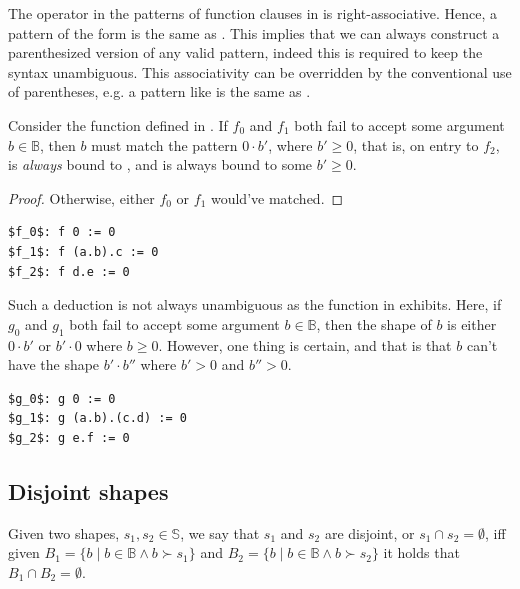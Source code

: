 The  operator in the patterns of function clauses in \D{} is
right-associative. Hence, a pattern of the form  is the same as
. This implies that we can always construct a parenthesized
version of any valid pattern, indeed this is required to keep the syntax
unambiguous. This associativity can be overridden by the conventional use of
parentheses, e.g. a pattern like  is the same as
. 

Consider the function defined in . If $f_0$ and
$f_1$ both fail to accept some argument $b\in\mathbb{B}$, then $b$ must match
the pattern $0\cdot b'$, where $b'\geq 0$, that is, on entry to $f_2$, 
is \emph{always} bound to , and  is always bound to some
$b'\geq 0$.

\begin{proof} Otherwise, either $f_0$ or $f_1$ would've matched. \end{proof}

\begin{lstlisting}[label=listing:deducing-zero,
  caption={A sample program for showing 0-deduction.}]
$f_0$: f 0 := 0
$f_1$: f (a.b).c := 0
$f_2$: f d.e := 0
\end{lstlisting}

Such a deduction is not always unambiguous as the function in
 exhibits. Here, if $g_0$ and $g_1$ both
fail to accept some argument $b\in\mathbb{B}$, then the shape of $b$ is either
$0\cdot b'$ or $b'\cdot 0$ where $b\geq 0$. However, one thing is certain, and
that is that $b$ can't have the shape $b'\cdot b''$ where $b'>0$ and $b''>0$.

\begin{lstlisting}[label=listing:deducing-zero-fail,
  caption={A sample program where 0-deduction is ambiguous.}]
$g_0$: g 0 := 0
$g_1$: g (a.b).(c.d) := 0
$g_2$: g e.f := 0
\end{lstlisting}

\subsection{Disjoint shapes}

\begin{definition} Given two shapes, $s_1,s_2\in\mathbb{S}$, we say that $s_1$
and $s_2$ are disjoint, or $s_1\cap s_2=\emptyset$, iff given $B_1=\{b\mid
b\in\mathbb{B} \wedge b\succ s_1\}$ and $B_2=\{b\mid b\in\mathbb{B} \wedge
b\succ s_2\}$ it holds that $B_1\cap B_2=\emptyset$.\end{definition}

